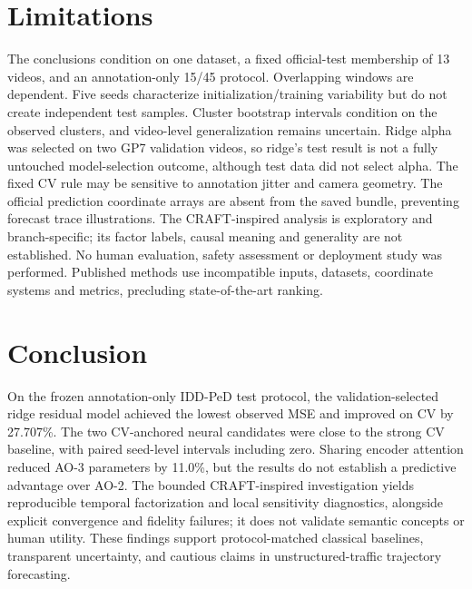 \documentclass[11pt]{article}
\begin{document}
\section{Limitations}
The conclusions condition on one dataset, a fixed official-test membership of 13 videos, and an annotation-only 15/45 protocol. Overlapping windows are dependent. Five seeds characterize initialization/training variability but do not create independent test samples. Cluster bootstrap intervals condition on the observed clusters, and video-level generalization remains uncertain. Ridge alpha was selected on two GP7 validation videos, so ridge's test result is not a fully untouched model-selection outcome, although test data did not select alpha. The fixed CV rule may be sensitive to annotation jitter and camera geometry. The official prediction coordinate arrays are absent from the saved bundle, preventing forecast trace illustrations. The CRAFT-inspired analysis is exploratory and branch-specific; its factor labels, causal meaning and generality are not established. No human evaluation, safety assessment or deployment study was performed. Published methods use incompatible inputs, datasets, coordinate systems and metrics, precluding state-of-the-art ranking.

\section{Conclusion}
On the frozen annotation-only IDD-PeD test protocol, the validation-selected ridge residual model achieved the lowest observed MSE and improved on CV by 27.707\%. The two CV-anchored neural candidates were close to the strong CV baseline, with paired seed-level intervals including zero. Sharing encoder attention reduced AO-3 parameters by 11.0\%, but the results do not establish a predictive advantage over AO-2. The bounded CRAFT-inspired investigation yields reproducible temporal factorization and local sensitivity diagnostics, alongside explicit convergence and fidelity failures; it does not validate semantic concepts or human utility. These findings support protocol-matched classical baselines, transparent uncertainty, and cautious claims in unstructured-traffic trajectory forecasting.



\end{document}
